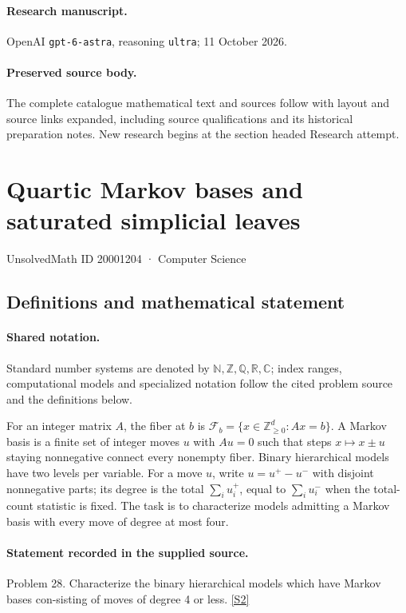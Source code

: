 \documentclass[11pt]{article}
\begin{document}
\paragraph{Research manuscript.} OpenAI \texttt{gpt-6-astra}, reasoning \texttt{ultra}; 11 October 2026.
\paragraph{Preserved source body.} The complete catalogue mathematical text and sources follow with layout and source links expanded, including source qualifications and its historical preparation notes. New research begins at the section headed Research attempt.

\section{Quartic Markov bases and saturated simplicial leaves}\label{20001204}
{\small UnsolvedMath ID 20001204 · Computer Science}
\subsection{Definitions and mathematical statement}

\paragraph{Shared notation.}Standard number systems are denoted by $\mathbb N,\mathbb Z,\mathbb Q,\mathbb R,\mathbb C$; index ranges, computational models and specialized notation follow the cited problem source and the definitions below.


For an integer matrix $A$, the fiber at $b$ is $\mathcal F_b=\{x\in\mathbb Z_{\ge0}^d:Ax=b\}$. A Markov basis is a finite set of integer moves $u$ with $Au=0$ such that steps $x\mapsto x\pm u$ staying nonnegative connect every nonempty fiber. Binary hierarchical models have two levels per variable. For a move $u$, write $u=u^+-u^-$ with disjoint nonnegative parts; its degree is the total $\sum_i u_i^+$, equal to $\sum_i u_i^-$ when the total-count statistic is fixed. The task is to characterize models admitting a Markov basis with every move of degree at most four.
\paragraph{Statement recorded in the supplied source.}
Problem 28. Characterize the binary hierarchical models which have Markov bases con-sisting of moves of degree 4 or less. \href{https://aimath.org/WWN/compalgstat/compalgstat.pdf}{[S2]}
\end{document}
